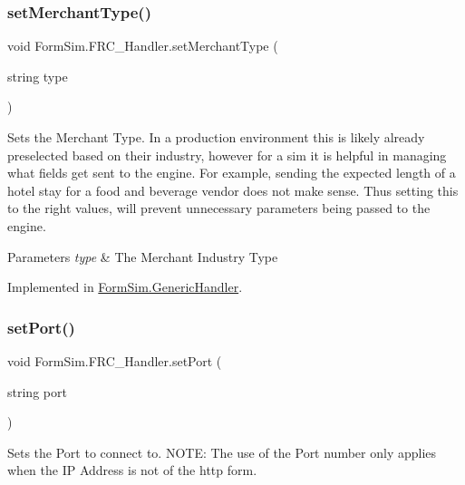 \subsubsection{\texorpdfstring{set\+Merchant\+Type()}{setMerchantType()}}
{\footnotesize\ttfamily void Form\+Sim.\+F\+R\+C\+\_\+\+Handler.\+set\+Merchant\+Type (\begin{DoxyParamCaption}\item[{string}]{type }\end{DoxyParamCaption})}



Sets the Merchant Type. In a production environment this is likely already preselected based on their industry, however for a sim it is helpful in managing what fields get sent to the engine. For example, sending the expected length of a hotel stay for a food and beverage vendor does not make sense. Thus setting this to the right values, will prevent unnecessary parameters being passed to the engine. 


\begin{DoxyParams}{Parameters}
{\em type} & The Merchant Industry Type\\
\hline
\end{DoxyParams}


Implemented in \mbox{\hyperlink{class_form_sim_1_1_generic_handler_a0a3b84b949b002deecb5523cec3cae23}{Form\+Sim.\+Generic\+Handler}}.

\mbox{\label{interface_form_sim_1_1_f_r_c___handler_a0a0a83b20fd2b3ec4ef9bbe5f5549b35}} 
\subsubsection{\texorpdfstring{set\+Port()}{setPort()}}
{\footnotesize\ttfamily void Form\+Sim.\+F\+R\+C\+\_\+\+Handler.\+set\+Port (\begin{DoxyParamCaption}\item[{string}]{port }\end{DoxyParamCaption})}



Sets the Port to connect to. N\+O\+TE\+: The use of the Port number only applies when the IP Address is not of the http form. 


